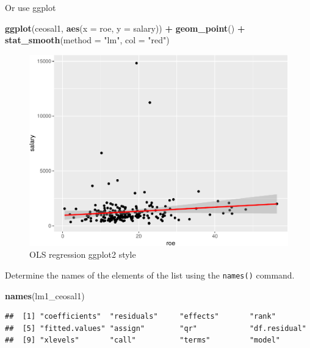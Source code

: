 \documentclass[]{book}
\newenvironment{Shaded}{\begin{snugshade}}{\end{snugshade}}
\newcommand{\DataTypeTok}[1]{\textcolor[rgb]{0.13,0.29,0.53}{#1}}
\newcommand{\KeywordTok}[1]{\textcolor[rgb]{0.13,0.29,0.53}{\textbf{#1}}}
\newcommand{\NormalTok}[1]{#1}
\newcommand{\OperatorTok}[1]{\textcolor[rgb]{0.81,0.36,0.00}{\textbf{#1}}}
\newcommand{\StringTok}[1]{\textcolor[rgb]{0.31,0.60,0.02}{#1}}
\begin{document}
Or use ggplot

\begin{Shaded}
\begin{Highlighting}[]
\KeywordTok{ggplot}\NormalTok{(ceosal1, }\KeywordTok{aes}\NormalTok{(}\DataTypeTok{x =}\NormalTok{ roe, }\DataTypeTok{y =}\NormalTok{ salary)) }\OperatorTok{+}\StringTok{ }
\StringTok{  }\KeywordTok{geom_point}\NormalTok{() }\OperatorTok{+}
\StringTok{  }\KeywordTok{stat_smooth}\NormalTok{(}\DataTypeTok{method =} \StringTok{"lm"}\NormalTok{, }\DataTypeTok{col =} \StringTok{"red"}\NormalTok{)}
\end{Highlighting}
\end{Shaded}

\begin{figure}

{\centering \includegraphics[width=0.8\linewidth]{MEM5220_R_files/figure-latex/fig2-1} 

}

\caption{OLS regression ggplot2 style}\label{fig:fig2}
\end{figure}

Determine the names of the elements of the list using the
\texttt{names()} command.

\begin{Shaded}
\begin{Highlighting}[]
\KeywordTok{names}\NormalTok{(lm1_ceosal1)}
\end{Highlighting}
\end{Shaded}

\begin{verbatim}
##  [1] "coefficients"  "residuals"     "effects"       "rank"         
##  [5] "fitted.values" "assign"        "qr"            "df.residual"  
##  [9] "xlevels"       "call"          "terms"         "model"
\end{verbatim}
\end{document}
